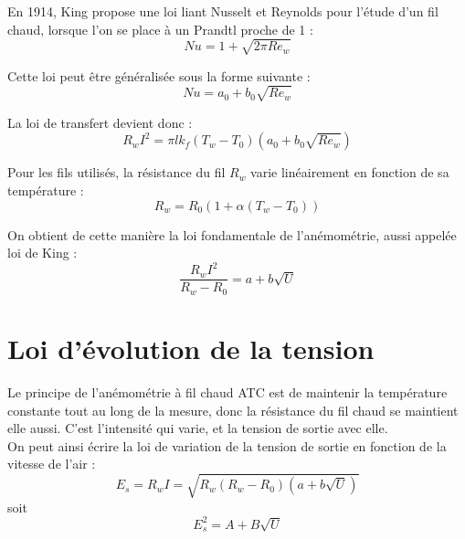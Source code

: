 \documentclass[12pt, a4paper]{report}
\begin{document}
	\noindent En 1914, King propose une loi liant Nusselt et Reynolds pour l'étude d'un fil chaud, lorsque l'on se place à un Prandtl proche de 1 :
	\begin{equation*}
		Nu = 1 + \sqrt{2 \pi Re_w}
	\end{equation*}
	
	\noindent Cette loi peut être généralisée sous la forme suivante :
	\begin{equation*}
		Nu = a_0 + b_0\sqrt{Re_w}
	\end{equation*}
	
	\noindent La loi de transfert devient donc :
	\begin{equation*}
		R_w I^2 = \pi l k_f (T_w - T_0)(a_0+b_0\sqrt{Re_w})
	\end{equation*}
	
	\noindent Pour les fils utilisés, la résistance du fil $R_w$ varie linéairement en fonction de sa température :
	\begin{equation*}
		R_w = R_0(1+\alpha(T_w-T_0))
	\end{equation*}
	
	\noindent On obtient de cette manière la loi fondamentale de l'anémométrie, aussi appelée loi de King :
	\begin{equation*}
		\boxed{\frac{R_w I^2}{R_w-R_0} = a + b\sqrt{U}}
	\end{equation*}
	
	\section{Loi d'évolution de la tension}
	Le principe de l'anémométrie à fil chaud ATC est de maintenir la température constante tout au long de la mesure, donc la résistance du fil chaud se maintient elle aussi. C'est l'intensité qui varie, et la tension de sortie avec elle.\\
	
	\noindent On peut ainsi écrire la loi de variation de la tension de sortie en fonction de la vitesse de l'air :
	\begin{equation*}
		E_s = R_w I = \sqrt{R_w(R_w-R_0)(a + b\sqrt{U})}
	\end{equation*}
	soit
	\begin{equation*}
		E_s^2 = A + B\sqrt{U}
	\end{equation*}
	
\end{document}
